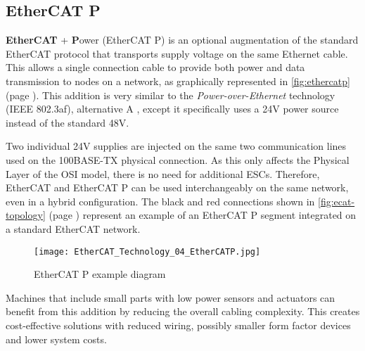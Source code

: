 \subsection{EtherCAT P}

\textbf{EtherCAT} + \textbf Power (EtherCAT P) is an optional augmentation of the standard EtherCAT protocol that transports supply voltage on the same Ethernet cable.
This allows a single connection cable to provide both power and data transmission to nodes on a network, as graphically represented in \autoref{fig:ethercatp} (page \pageref{fig:ethercatp}).
This addition is very similar to the \emph{Power-over-Ethernet} technology (IEEE 802.3af), alternative A \cite{technology:poe}, except it specifically uses a 24V power source instead of the standard 48V.

Two individual 24V supplies are injected on the same two communication lines used on the 100BASE-TX \cite{technology:poe} physical connection.
As this only affects the Physical Layer of the OSI model, there is no need for additional ESCs.
Therefore, EtherCAT and EtherCAT P can be used interchangeably on the same network, even in a hybrid configuration.
The black and red connections shown in \autoref{fig:ecat-topology} (page \pageref{fig:ecat-topology}) represent an example of an EtherCAT P segment integrated on a standard EtherCAT network.

\begin{figure}[htp]
	\centering
	\texttt{[image: EtherCAT\_Technology\_04\_EtherCATP.jpg]}
	\caption{EtherCAT P example diagram \cite{protocol:ethercat}}
	\label{fig:ethercatp}
\end{figure}

Machines that include small parts with low power sensors and actuators can benefit from this addition by reducing the overall cabling complexity.
This creates cost-effective solutions with reduced wiring, possibly smaller form factor devices and lower system costs.
